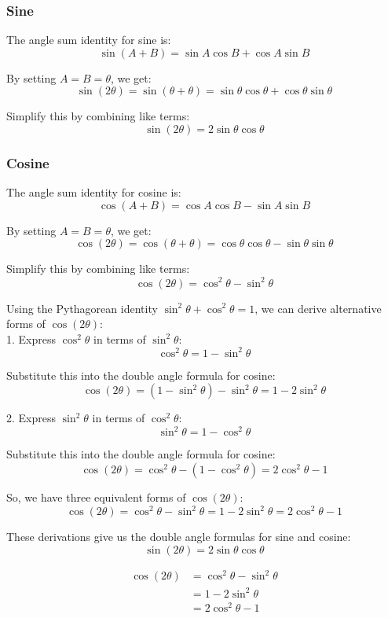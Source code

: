 \documentclass[12pt]{article}
\begin{document}
\subsubsection{Sine}

The angle sum identity for sine is:
\[
\sin(A + B) = \sin A \cos B + \cos A \sin B
\]

By setting \(A = B = \theta\), we get:
\[
\sin(2\theta) = \sin(\theta + \theta) = \sin \theta \cos \theta + \cos \theta \sin \theta
\]

Simplify this by combining like terms:
\[
\sin(2\theta) = 2 \sin \theta \cos \theta
\]

\subsubsection{Cosine}

The angle sum identity for cosine is:
\[
\cos(A + B) = \cos A \cos B - \sin A \sin B
\]

By setting \(A = B = \theta\), we get:
\[
\cos(2\theta) = \cos(\theta + \theta) = \cos \theta \cos \theta - \sin \theta \sin \theta
\]

Simplify this by combining like terms:
\[
\cos(2\theta) = \cos^2 \theta - \sin^2 \theta
\]

Using the Pythagorean identity \(\sin^2 \theta + \cos^2 \theta = 1\), we can derive alternative forms of \(\cos(2\theta)\):\\

1. Express \(\cos^2 \theta\) in terms of \(\sin^2 \theta\):
\[
\cos^2 \theta = 1 - \sin^2 \theta
\]

Substitute this into the double angle formula for cosine:
\[
\cos(2\theta) = (1 - \sin^2 \theta) - \sin^2 \theta = 1 - 2 \sin^2 \theta
\]

2. Express \(\sin^2 \theta\) in terms of \(\cos^2 \theta\):
\[
\sin^2 \theta = 1 - \cos^2 \theta
\]

Substitute this into the double angle formula for cosine:
\[
\cos(2\theta) = \cos^2 \theta - (1 - \cos^2 \theta) = 2 \cos^2 \theta - 1
\]

So, we have three equivalent forms of \(\cos(2\theta)\):
\[
\cos(2\theta) = \cos^2 \theta - \sin^2 \theta = 1 - 2 \sin^2 \theta = 2 \cos^2 \theta - 1
\]

These derivations give us the double angle formulas for sine and cosine:
\[
\sin(2\theta) = 2 \sin \theta \cos \theta
\]

\begin{align*}
\cos(2\theta) &= \cos^2 \theta - \sin^2 \theta \\
  &= 1 - 2 \sin^2 \theta \\
  &= 2 \cos^2 \theta - 1
\end{align*}
\end{document}
